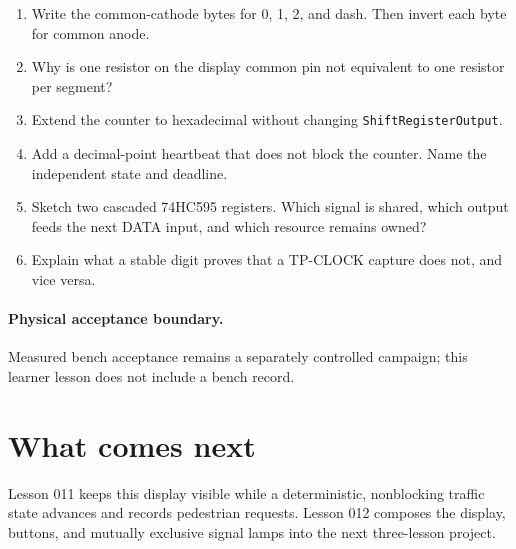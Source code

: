 \documentclass[11pt]{article}
\begin{document}
\begin{enumerate}
  \item Write the common-cathode bytes for 0, 1, 2, and dash. Then invert each
        byte for common anode.
  \item Why is one resistor on the display common pin not equivalent to one
        resistor per segment?
  \item Extend the counter to hexadecimal without changing
        \texttt{ShiftRegisterOutput}.
  \item Add a decimal-point heartbeat that does not block the counter. Name
        the independent state and deadline.
  \item Sketch two cascaded 74HC595 registers. Which signal is shared, which
        output feeds the next DATA input, and which resource remains owned?
  \item Explain what a stable digit proves that a TP-CLOCK capture does not,
        and vice versa.
\end{enumerate}

\newpage
\paragraph{Physical acceptance boundary.}
Measured bench acceptance remains a separately controlled campaign; this
learner lesson does not include a bench record.
\section{What comes next}

Lesson 011 keeps this display visible while a deterministic, nonblocking
traffic state advances and records pedestrian requests. Lesson 012 composes
the display, buttons, and mutually exclusive signal lamps into the next
three-lesson project.
\end{document}
